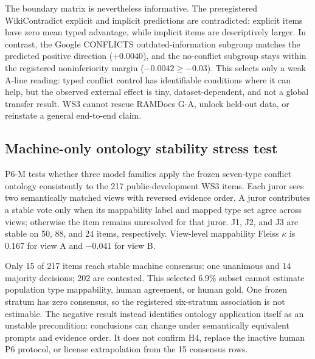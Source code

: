 \documentclass[letterpaper]{article}
\begin{document}
The boundary matrix is nevertheless informative. The preregistered
WikiContradict explicit and implicit predictions are contradicted: explicit
items have zero mean typed advantage, while implicit items are descriptively
larger. In contrast, the Google CONFLICTS outdated-information subgroup matches
the predicted positive direction ($+0.0040$), and the no-conflict subgroup
stays within the registered noninferiority margin ($-0.0042 \geq -0.03$). This
selects only a weak A-line reading: typed conflict control has identifiable
conditions where it can help, but the observed external effect is tiny,
dataset-dependent, and not a global transfer result. WS3 cannot rescue RAMDocs
G-A, unlock held-out data, or reinstate a general end-to-end claim.

\subsection{Machine-only ontology stability stress test}

P6-M tests whether three model families apply the frozen seven-type conflict
ontology consistently to the 217 public-development WS3 items. Each juror sees
two semantically matched views with reversed evidence order. A juror contributes
a stable vote only when its mappability label and mapped type set agree across
views; otherwise the item remains unresolved for that juror. J1, J2, and J3 are
stable on 50, 88, and 24 items, respectively. View-level mappability Fleiss
$\kappa$ is 0.167 for view A and $-0.041$ for view B.

Only 15 of 217 items reach stable machine consensus: one unanimous and 14
majority decisions; 202 are contested. This selected 6.9\% subset cannot estimate population type mappability, human agreement, or human gold. One
frozen stratum has zero consensus, so the registered six-stratum association
is not estimable. The negative result instead identifies ontology application
itself as an unstable precondition: conclusions can change under semantically
equivalent prompts and evidence order. It does not confirm H4, replace the
inactive human P6 protocol, or license extrapolation from the 15 consensus rows.
\end{document}

